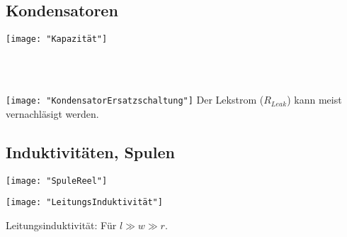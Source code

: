 \subsection{Kondensatoren}
\begin{minipage}[t]{0.3\textwidth}
	\vspace{0pt}
	\texttt{[image: "Kapazität"]}
\end{minipage}\hspace{0.05\textwidth}
\begin{minipage}[t]{0.3\textwidth}
	\vspace{0pt}
	\\
	\\
\end{minipage}\hspace{0.05\textwidth}
\begin{minipage}[t]{0.3\textwidth}
	\vspace{0pt}
	\texttt{[image: "KondensatorErsatzschaltung"]}
	Der Lekstrom ($R_{Leak}$) kann meist vernachläsigt werden.
\end{minipage}
\vspace{2mm}


\subsection{Induktivitäten, Spulen}
\begin{minipage}[t]{0.3\textwidth}
	\vspace{0pt}
	\texttt{[image: "SpuleReel"]}
\end{minipage}\hspace{0.05\textwidth}
\begin{minipage}[t]{0.3\textwidth}
	\vspace{0pt}
	\texttt{[image: "LeitungsInduktivität"]}
\end{minipage}\hspace{0.05\textwidth}
\begin{minipage}[t]{0.3\textwidth}
	\vspace{0pt}
	Leitungsinduktivität:
	Für $l \gg w\gg r$.
\end{minipage}
\vspace{2mm}









